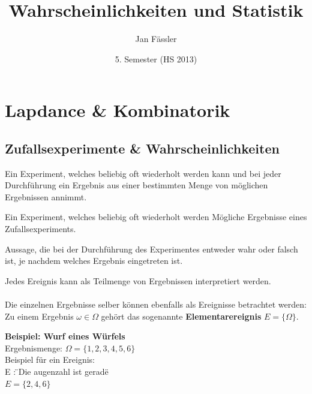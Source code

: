 \documentclass[10pt]{article}
\title{
	\vspace{5cm}
	Wahrscheinlichkeiten und Statistik
}
\author{Jan Fässler}
\date{5. Semester (HS 2013)}
\newtheorem[M]{definition}{Def.}
\newtheorem[M]{satz}{Satz}
\numberwithin{equation}{section}
\begin{document}
\maketitle
\thispagestyle{fancy}
\newpage

\tableofcontents	  	


\newpage
\setcounter{page}{1}


\section{Lapdance \& Kombinatorik}

\subsection{Zufallsexperimente \& Wahrscheinlichkeiten}

\begin{definition}[Zufallsexperiment]
Ein Experiment, welches beliebig oft wiederholt werden kann und bei jeder Durchführung ein Ergebnis aus einer bestimmten Menge von möglichen Ergebnissen annimmt.
\end{definition}

\begin{definition}
Ein Experiment, welches beliebig oft wiederholt werden Mögliche Ergebnisse eines Zufallsexperiments.
\end{definition}

\begin{definition}[Ergebnis]
Aussage, die bei der Durchführung des Experimentes entweder wahr oder falsch ist, je nachdem welches Ergebnis eingetreten ist.
\end{definition}
Jedes Ereignis kann als Teilmenge von Ergebnissen interpretiert werden. \\
\\
Die einzelnen Ergebnisse selber können ebenfalls als Ereignisse betrachtet werden: \\
Zu einem Ergebnis $\omega \in \Omega$ gehört das sogenannte \textbf{Elementarereignis} $E = \{\Omega\}$.

\textbf{Beispiel:  Wurf eines Würfels} \\
Ergebnismenge: $\Omega=\{1,2,3,4,5,6\}$ \\
Beispiel für ein Ereignis:\\
E : \"{}Die augenzahl ist gerade\"{} \\
$E=\{2,4,6\}$ \\
\end{document}
